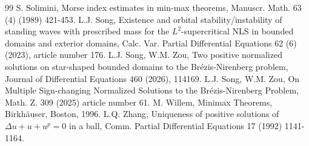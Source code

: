 \documentclass[10pt,a4paper]{article}
\theoremstyle{definition} \theoremstyle{remark}
\numberwithin{equation}{section}
\begin{document}
\begin{thebibliography}{99}
	  S. Solimini, Morse index estimates in min-max theorems, Manuscr. Math. 63 (4) (1989) 421-453.
	  L.J. Song, Existence and orbital stability/instability of standing waves with prescribed mass for the $L^2$-supercritical NLS in bounded domains and exterior domains, Calc. Var. Partial Differential Equations 62 (6) (2023), article number 176.
	  L.J. Song, W.M. Zou, Two positive normalized solutions on star-shaped bounded domains to the Br\'ezis-Nirenberg problem, Journal of Differential Equations 460 (2026), 114169.
	  L.J. Song, W.M. Zou, On Multiple Sign-changing Normalized Solutions to the Br\'ezis-Nirenberg Problem, Math. Z. 309 (2025) article number 61.
	  M. Willem, Minimax Theorems, Birkh\"auser, Boston, 1996.
	  L.Q. Zhang, Uniqueness of positive solutions of $\Delta u + u + u^p = 0$ in a ball, Comm. Partial Differential Equations 17 (1992) 1141-1164.
\end{thebibliography}
\end{document}
